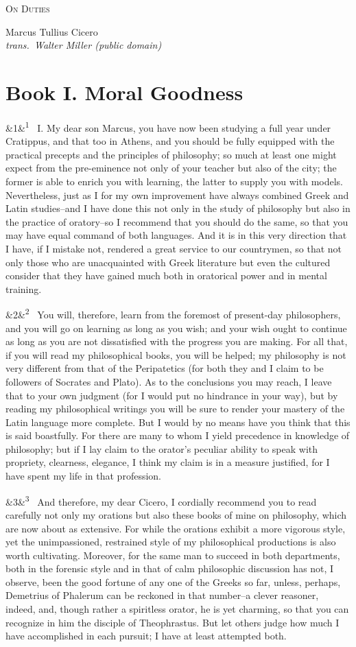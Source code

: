 \documentclass[12pt]{article}
\newcommand{\work}[1]{\begin{center}\LARGE\scshape #1\end{center}}
\newcommand{\attrib}[2]{\begin{center}\large #1\\[2pt]\small\itshape trans.\ #2\end{center}\vspace{1em}}
\newcommand{\para}[1][]{\par\noindent\ifx&#1&\else\textsuperscript{\footnotesize #1}~\fi}
\begin{document}
\work{On Duties}
\attrib{Marcus Tullius Cicero}{Walter Miller (public domain)}

\section*{Book I. Moral Goodness}

\para[1] I. My dear son Marcus, you have now been studying a full year under Cratippus, and that too in Athens, and you should be fully equipped with the practical precepts and the principles of philosophy; so much at least one might expect from the pre-eminence not only of your teacher but also of the city; the former is able to enrich you with learning, the latter to supply you with models. Nevertheless, just as I for my own improvement have always combined Greek and Latin studies--and I have done this not only in the study of philosophy but also in the practice of oratory--so I recommend that you should do the same, so that you may have equal command of both languages. And it is in this very direction that I have, if I mistake not, rendered a great service to our countrymen, so that not only those who are unacquainted with Greek literature but even the cultured consider that they have gained much both in oratorical power and in mental training.

\para[2] You will, therefore, learn from the foremost of present-day philosophers, and you will go on learning as long as you wish; and your wish ought to continue as long as you are not dissatisfied with the progress you are making. For all that, if you will read my philosophical books, you will be helped; my philosophy is not very different from that of the Peripatetics (for both they and I claim to be followers of Socrates and Plato). As to the conclusions you may reach, I leave that to your own judgment (for I would put no hindrance in your way), but by reading my philosophical writings you will be sure to render your mastery of the Latin language more complete. But I would by no means have you think that this is said boastfully. For there are many to whom I yield precedence in knowledge of philosophy; but if I lay claim to the orator's peculiar ability to speak with propriety, clearness, elegance, I think my claim is in a measure justified, for I have spent my life in that profession.

\para[3] And therefore, my dear Cicero, I cordially recommend you to read carefully not only my orations but also these books of mine on philosophy, which are now about as extensive. For while the orations exhibit a more vigorous style, yet the unimpassioned, restrained style of my philosophical productions is also worth cultivating. Moreover, for the same man to succeed in both departments, both in the forensic style and in that of calm philosophic discussion has not, I observe, been the good fortune of any one of the Greeks so far, unless, perhaps, Demetrius of Phalerum can be reckoned in that number--a clever reasoner, indeed, and, though rather a spiritless orator, he is yet charming, so that you can recognize in him the disciple of Theophrastus. But let others judge how much I have accomplished in each pursuit; I have at least attempted both.
\end{document}
